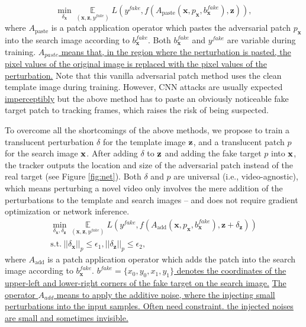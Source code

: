 \documentclass[journal]{IEEEtran}
\newcommand{\ie}{i.e.}
\begin{document}
\begin{equation}
    \min\limits_{\delta_\textbf{x}} \mathop{\mathbb{E}}\limits_{(\textbf{x}, \textbf{z}, y^{fake})} L(y^{fake}, f(A_{\text{paste}}(\textbf{x}, p_\textbf{x}, b^{fake}_{\textbf{x}}), \textbf{z})),
\end{equation}
where $A_{\text{paste}}$ is a patch application operator \cite{patch} which pastes the adversarial patch $p_\textbf{x}$ into the search image according to $b^{fake}_{\textbf{x}}$. Both $b^{fake}_{\textbf{x}}$ and $y^{fake}$ are variable during training.
\uline{$A_{paste}$ means that, in the region where the perturbation is pasted, the pixel values of the original image is replaced with the pixel values of the perturbation.}
Note that this vanilla adversarial patch method uses the clean template image during training. However, CNN attacks are usually expected \uline{imperceptibly} but the above method has to paste an obviously noticeable fake target patch to tracking frames, which raises the risk of being suspected.

To overcome all the shortcomings of the above methods, we propose to train a translucent perturbation $\delta$ for the template image $\textbf z$, and a translucent patch $p$ for the search image $\textbf x$. 
After adding $\delta$ to $\textbf z$ and adding the fake target $p$ into $\textbf x$, the tracker outputs the location and size of the adversarial patch instead of the real target (see Figure \ref{fig:net}). Both $\delta$ and $p$ are universal (\ie, video-agnostic), which means perturbing a novel video only involves the mere addition of the perturbations to the template and search images -- and does not require gradient optimization or network inference.
\begin{equation}
  \begin{gathered}
    \min\limits_{\delta_\textbf{x}, \delta_\textbf{z}} \mathop{\mathbb{E}}\limits_{(\textbf{x}, \textbf{z}, y^{fake})} L(y^{fake}, f(A_{\text{add}}(\textbf{x}, p_\textbf{x}, b^{fake}_{\textbf{x}}), \textbf{z} + \delta_\textbf{z}))\\
    \text{s.t.}\ ||\delta_\textbf{x}||_p \le \epsilon_1, ||\delta_\textbf{z}||_p \le \epsilon_2,
  \end{gathered}
\end{equation}
where $A_{\text{add}}$ is a patch application operator which adds the patch into the search image according to $b^{fake}_{\textbf{x}}$.
\uline{$b^{fake} = \{x_0, y_0, x_1, y_1\}$ denotes the coordinates of the upper-left and lower-right corners of the fake target on the search image.}
\uline{The operator $A_{add}$ means to apply the additive noise, where the injecting small perturbations into the input samples. Often need constraint. the injected noises are small and sometimes invisible.}
\end{document}
